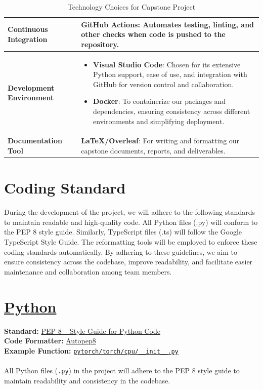 \documentclass{article}
\begin{document}
\begin{table}[h!]
\begin{tabularx}{\textwidth}{| >{\raggedright\arraybackslash}m{3.5cm} | >{\raggedright\arraybackslash}X |}
        \textbf{Continuous Integration} & \textbf{GitHub Actions}: Automates testing, linting, and other checks when code is pushed to the repository. \\ \hline
        \textbf{Development Environment} & \begin{itemize}
          \item \textbf{Visual Studio Code}: Chosen for its extensive Python support, ease of use, and integration with GitHub for version control and collaboration.
          \item \textbf{Docker}: To containerize our packages and dependencies, ensuring consistency across different environments and simplifying deployment.
      \end{itemize}\\ \hline
        \textbf{Documentation Tool} & \textbf{LaTeX/Overleaf}: For writing and formatting our capstone documents, reports, and deliverables. \\ \hline
    \end{tabularx}
    \caption{Technology Choices for Capstone Project}
\end{table}

\newpage
\section{Coding Standard}
During the development of the project, we will adhere to the following standards to maintain readable and high-quality code. All Python files (.py) will conform to the PEP 8 style guide. Similarly, TypeScript files (.ts) will follow the Google TypeScript Style Guide. The reformatting tools will be employed to enforce these coding standards automatically. By adhering to these guidelines, we aim to ensure consistency across the codebase, improve readability, and facilitate easier maintenance and collaboration among team members.

\section*{\href{https://github.com/python/cpython}{Python}}

\textbf{Standard:} \href{https://peps.python.org/pep-0008/}{PEP 8 – Style Guide for Python Code} \\
\textbf{Code Formatter:} \href{https://github.com/hhatto/autopep8}{Autopep8} \\
\textbf{Example Function:} \texttt{\href{https://github.com/pytorch/pytorch/blob/main/torch/cpu/__init__.py}{pytorch/torch/cpu/\_\_init\_\_.py}} \\\\
All Python files (\texttt{.py}) in the project will adhere to the PEP 8 style guide to maintain readability and consistency in the codebase.
\end{document}
